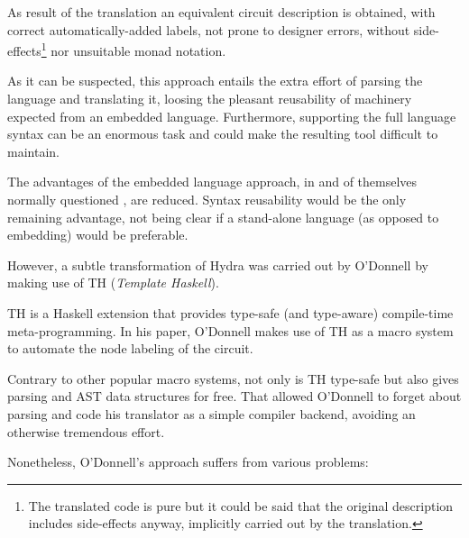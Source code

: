   As result of the translation an equivalent circuit description is obtained,
  with correct automatically-added labels, not prone to designer errors,
  without side-effects\footnote{The translated code is pure but it could be
    said that the original description includes side-effects anyway, implicitly
    carried out by the translation.} nor unsuitable monad notation.
  
  As it can be suspected, this approach entails the extra effort
  of parsing the language and translating it, loosing the pleasant
  reusability of machinery expected from an embedded language.
  Furthermore, supporting the full language syntax can be an enormous task
  and could make the resulting tool difficult to maintain. 
  

  The advantages of the embedded language approach, in and of themselves
  normally questioned \cite{another}, are reduced.
  Syntax reusability would be the only remaining advantage, not being
  clear if a stand-alone language (as opposed to embedding) would be
  preferable.
  
  However, a subtle transformation of Hydra was carried out
  by O'Donnell  \cite{hydra:th} by making use of TH (\textit{Template
    Haskell}).
  
  TH \cite{metahaskell} is a Haskell extension that provides type-safe
  (and type-aware) compile-time meta-programming. In his paper,
  O'Donnell makes use of TH as a macro system to automate the node
  labeling of the circuit.
  
  Contrary to other popular macro systems, not only is TH type-safe but
  also gives parsing and AST data structures for free. That allowed
  O'Donnell to forget about parsing and code his translator as a simple
  compiler backend, avoiding an otherwise tremendous effort.
  
  Nonetheless, O'Donnell's approach suffers from various problems:
  
